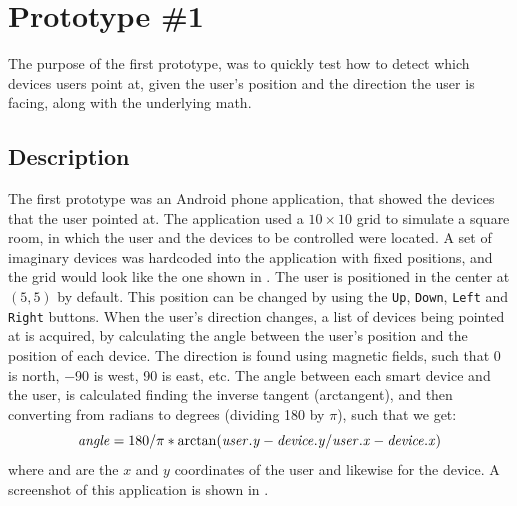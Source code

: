 \section{Prototype \#1}
\label{sec:implementation:prototypes:prototype1}
The purpose of the first prototype, 
was to quickly test how to detect which devices users point at, 
given the user's position and the direction the user is facing, 
along with the underlying math.

\subsection{Description}
The first prototype was an Android phone application, 
that showed the devices that the user pointed at.
The application used a $10 \times 10$ grid to simulate a square room, 
in which the user and the devices to be controlled were located.
A set of imaginary devices was hardcoded into the application with fixed positions, 
and the grid would look like the one shown in .
The user is positioned in the center at $(5,5)$ by default. 
This position can be changed by using the \texttt{Up}, \texttt{Down}, \texttt{Left} and \texttt{Right} buttons.
When the user's direction changes, 
a list of devices being pointed at is acquired, 
by calculating the angle between the user's position and the position of each device.
The direction is found using magnetic fields, 
such that \num{0} is north, \num{-90} is west, \num{90} is east, etc. 
The angle between each smart device and the user, 
is calculated finding the inverse tangent (arctangent), 
and then converting from radians to degrees (dividing \num{180} by $\pi$), 
such that we get:
\begin{equation}\label{eq:angle}
\var{angle} = 180 / \pi * \arctan(\var{user.y} - \var{device.y} / \var{user.x} - \var{device.x})
\end{equation}
where  and  are the $x$ and $y$ coordinates of the user and likewise for the device.
A screenshot of this application is shown in .

